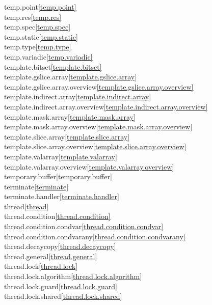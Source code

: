 \begin{multicols}{2}
temp.point\quad\ref{temp.point}\\
temp.res\quad\ref{temp.res}\\
temp.spec\quad\ref{temp.spec}\\
temp.static\quad\ref{temp.static}\\
temp.type\quad\ref{temp.type}\\
temp.variadic\quad\ref{temp.variadic}\\
template.bitset\quad\ref{template.bitset}\\
template.gslice.array\quad\ref{template.gslice.array}\\
template.gslice.array.overview\quad\ref{template.gslice.array.overview}\\
template.indirect.array\quad\ref{template.indirect.array}\\
template.indirect.array.overview\quad\ref{template.indirect.array.overview}\\
template.mask.array\quad\ref{template.mask.array}\\
template.mask.array.overview\quad\ref{template.mask.array.overview}\\
template.slice.array\quad\ref{template.slice.array}\\
template.slice.array.overview\quad\ref{template.slice.array.overview}\\
template.valarray\quad\ref{template.valarray}\\
template.valarray.overview\quad\ref{template.valarray.overview}\\
temporary.buffer\quad\ref{temporary.buffer}\\
terminate\quad\ref{terminate}\\
terminate.handler\quad\ref{terminate.handler}\\
thread\quad\ref{thread}\\
thread.condition\quad\ref{thread.condition}\\
thread.condition.condvar\quad\ref{thread.condition.condvar}\\
thread.condition.condvarany\quad\ref{thread.condition.condvarany}\\
thread.decaycopy\quad\ref{thread.decaycopy}\\
thread.general\quad\ref{thread.general}\\
thread.lock\quad\ref{thread.lock}\\
thread.lock.algorithm\quad\ref{thread.lock.algorithm}\\
thread.lock.guard\quad\ref{thread.lock.guard}\\
thread.lock.shared\quad\ref{thread.lock.shared}\\

\end{multicols}
